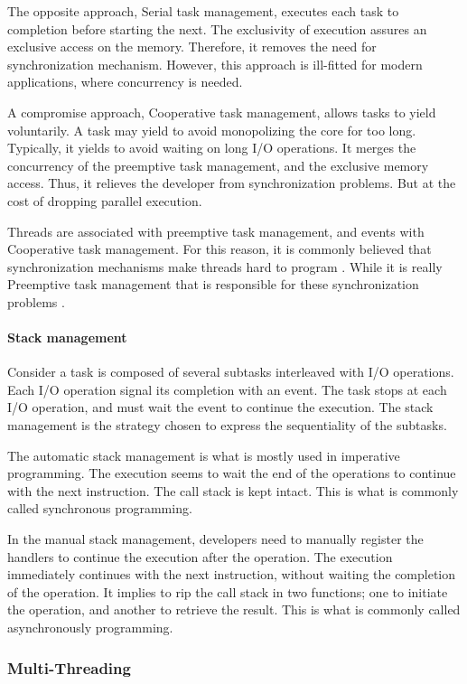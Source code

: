 The opposite approach, Serial task management, executes each task to completion before starting the next.
The exclusivity of execution assures an exclusive access on the memory.
Therefore, it removes the need for synchronization mechanism.
However, this approach is ill-fitted for modern applications, where concurrency is needed.

A compromise approach, Cooperative task management, allows tasks to yield voluntarily.
A task may yield to avoid monopolizing the core for too long.
Typically, it yields to avoid waiting on long I/O operations.
It merges the concurrency of the preemptive task management, and the exclusive memory access.
Thus, it relieves the developer from synchronization problems.
But at the cost of dropping parallel execution.

Threads are associated with preemptive task management, and events with Cooperative task management.
For this reason, it is commonly believed that synchronization mechanisms make threads hard to program \cite{Ousterhout1996}.
While it is really Preemptive task management that is responsible for these synchronization problems \cite{Adya2002}.

\paragraph{Stack management}

Consider a task is composed of several subtasks interleaved with I/O operations.
Each I/O operation signal its completion with an event.
The task stops at each I/O operation, and must wait the event to continue the execution.
The stack management is the strategy chosen to express the sequentiality of the subtasks.

The automatic stack management is what is mostly used in imperative programming.
The execution seems to wait the end of the operations to continue with the next instruction.
The call stack is kept intact.
This is what is commonly called synchronous programming.

In the manual stack management, developers need to manually register the handlers to continue the execution after the operation.
The execution immediately continues with the next instruction, without waiting the completion of the operation.
It implies to rip the call stack in two functions; one to initiate the operation, and another to retrieve the result.
This is what is commonly called asynchronously programming.


\subsubsection{Multi-Threading}

